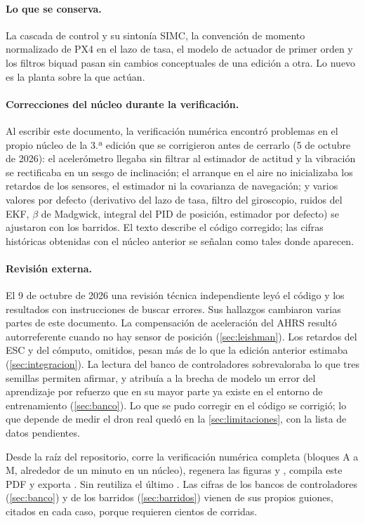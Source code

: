 \paragraph{Lo que se conserva.} La cascada de control y su sintonía SIMC, la
convención de momento normalizado de PX4 en el lazo de tasa, el modelo de
actuador de primer orden y los filtros biquad pasan sin cambios conceptuales
de una edición a otra. Lo nuevo es la planta sobre la que actúan.

\paragraph{Correcciones del núcleo durante la verificación.} Al escribir
este documento, la verificación numérica encontró problemas en el propio
núcleo de la 3.ª edición que se corrigieron antes de cerrarlo (5 de octubre
de 2026): el acelerómetro llegaba sin filtrar al estimador de actitud y la
vibración se rectificaba en un sesgo de inclinación; el arranque en el aire
no inicializaba los retardos de los sensores, el estimador ni la covarianza
de navegación; y varios valores por defecto (derivativo del lazo de tasa,
filtro del giroscopio, ruidos del EKF, $\beta$ de Madgwick, integral del PID
de posición, estimador por defecto) se ajustaron con los barridos. El texto
describe el código corregido; las cifras históricas obtenidas con el núcleo
anterior se señalan como tales donde aparecen.

\paragraph{Revisión externa.} El 9 de octubre de 2026 una revisión técnica
independiente leyó el código y los resultados con instrucciones de buscar
errores. Sus hallazgos cambiaron varias partes de este documento. La
compensación de aceleración del AHRS resultó autorreferente cuando no hay
sensor de posición (\cref{sec:leishman}). Los retardos del ESC y del cómputo,
omitidos, pesan más de lo que la edición anterior estimaba
(\cref{sec:integracion}). La lectura del banco de controladores sobrevaloraba
lo que tres semillas permiten afirmar, y atribuía a la brecha de modelo un
error del aprendizaje por refuerzo que en su mayor parte ya existe en el
entorno de entrenamiento (\cref{sec:banco}). Lo que se pudo corregir en el
código se corrigió; lo que depende de medir el dron real quedó en la
\cref{sec:limitaciones}, con la lista de datos pendientes.

\begin{nota}
Desde la raíz del repositorio, 
corre la verificación numérica completa (bloques A a M, alrededor de un
minuto en un núcleo), regenera las figuras y , compila este
PDF y exporta . Sin  reutiliza
el último . Las cifras de los bancos de
controladores (\cref{sec:banco}) y de los barridos (\cref{sec:barridos})
vienen de sus propios guiones, citados en cada caso, porque requieren
cientos de corridas.
\end{nota}
